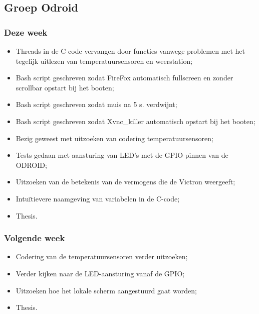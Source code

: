 \subsection*{Groep Odroid}
\subsubsection*{Deze week}
\begin{itemize}
\item Threads in de C-code vervangen door functies vanwege problemen met het tegelijk uitlezen van temperatuursensoren en weerstation;
\item Bash script geschreven zodat FireFox automatisch fullscreen en zonder scrollbar opstart bij het booten;
\item Bash script geschreven zodat muis na 5 s. verdwijnt;
\item Bash script geschreven zodat Xvnc\_killer automatisch opstart bij het booten;
\item Bezig geweest met uitzoeken van codering temperatuursensoren;
\item Tests gedaan met aansturing van LED's met de GPIO-pinnen van de ODROID;
\item Uitzoeken van de betekenis van de vermogens die de Victron weergeeft;
\item Intu\"itievere naamgeving van variabelen in de C-code;
\item Thesis.
\end{itemize}

\subsubsection*{Volgende week}
\begin{itemize}
\item Codering van de temperatuursensoren verder uitzoeken;
\item Verder kijken naar de LED-aansturing vanaf de GPIO;
\item Uitzoeken hoe het lokale scherm aangestuurd gaat worden;
\item Thesis.
\end{itemize}